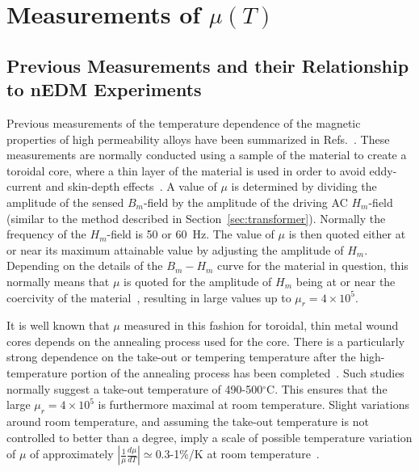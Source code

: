 


\section{Measurements of $\mu(T)$\label{sec:tdep}}

\subsection{Previous Measurements and their Relationship to nEDM Experiments\label{sec:previousmeasurement}}

Previous measurements of the temperature dependence of the magnetic
properties of high permeability alloys have been summarized in
Refs.~\cite{couderchon1982some,bozorth1993ferromagnetism,pfeifer1980soft}. These
measurements are normally conducted using a sample of the material to
create a toroidal core, where a thin layer of the material is used in
order to avoid eddy-current and skin-depth
effects~\cite{pfeifer1980soft,kruppvdm}. A value of $\mu$ is
determined by dividing the amplitude of the sensed $B_m$-field by the
amplitude of the driving AC $H_m$-field (similar to the method
described in Section~\ref{sec:transformer}). Normally the frequency
of the $H_m$-field is 50 or 60~Hz.  The value of $\mu$ is then quoted
either at or near its maximum attainable value by adjusting the
amplitude of $H_m$.  Depending on the details of the $B_m-H_m$ curve
for the material in question, this normally means that $\mu$ is quoted
for the amplitude of $H_m$ being at or near the coercivity of the
material~\cite{couderchon1982some,kruppvdm}, resulting in large values
up to $\mu_r=4\times 10^5$.

It is well known that $\mu$ measured in this fashion for toroidal,
thin metal wound cores depends on the annealing process used for the
core.  There is a particularly strong dependence on the take-out or
tempering temperature after the high-temperature portion of the
annealing process has been
completed~\cite{pfeifer1980soft,kruppvdm,couderchon1982some}. Such
studies normally suggest a take-out temperature of 490-500$^\circ$C.
This ensures that the large $\mu_r=4\times 10^{5}$ is furthermore
maximal at room temperature. Slight variations around room
temperature, and assuming the take-out temperature is not controlled
to better than a degree, imply a scale of possible temperature
variation of $\mu$ of approximately
$\left|\frac{1}{\mu}\frac{d\mu}{dT}\right|\simeq 0.3$-1\%/K at room
temperature~\cite{couderchon1982some,kruppvdm}.

